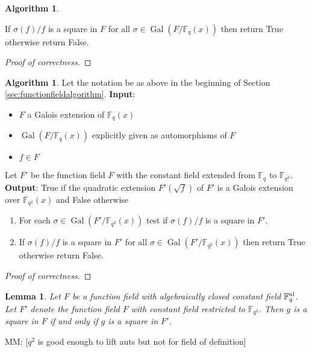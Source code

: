 \documentclass{dcthesis}
\newcommand{\mm}[1]{{\color{blue} \sf MM: [#1]}}
\newcommand{\FFqal}{{\mathbb F}_q^{\textup{al}}}
\newcommand{\FF}{\mathbb{F}}
\DeclareMathOperator{\Gal}{Gal}
\numberwithin{equation}{section}
\newtheorem{lemma}[equation]{Lemma}
\theoremstyle{definition}
\newtheorem{alg}[equation]{Algorithm}
\theoremstyle{remark}
\begin{document}
{{\begin{alg}
\begin{enumerate}
          If $\sigma(f)/f$ is a square in $F$
          for all $\sigma\in\Gal(F/\FF_q(x))$
          then return True
          otherwise return False.
      \end{enumerate}
    \end{alg}
    \begin{proof}[Proof of correctness]
    \end{proof}
    \begin{alg}
      \label{alg:isgaloisoverextension}
      Let the notation be
      as above in the beginning of
      Section
      \ref{sec:functionfieldalgorithm}.
      \newline
      \textbf{Input}:
      \begin{itemize}
        \item
          $F$ a Galois extension of
          $\FF_q(x)$
        \item
          $\Gal(F/\FF_q(x))$
          explicitly given
          as automorphisms of $F$
        \item
          $f\in F$
      \end{itemize}
      Let $F'$ be the function field $F$
      with the constant field
      extended
      from $\FF_q$ to $\FF_{q^2}$.
      \textbf{Output}:
      True if the quadratic extension
      $F'(\sqrt{f})$ of $F'$
      is a Galois extension over $\FF_{q^2}(x)$
      and False otherwise
      \begin{enumerate}
        \item
          For each $\sigma\in\Gal(F'/\FF_{q^2}(x))$
          test if $\sigma(f)/f$ is a square
          in $F'$.
        \item
          If $\sigma(f)/f$ is a square in $F'$
          for all $\sigma\in\Gal(F'/\FF_{q^2}(x))$
          then return True
          otherwise return False.
      \end{enumerate}
    \end{alg}
    \begin{proof}[Proof of correctness]
    \end{proof}
    \begin{lemma}
      \label{lem:qsquaredisgoodenough}
      Let $F$ be a function field
      with algebraically closed constant field
      $\FFqal$.
      Let $F'$ denote the function field $F$
      with constant field restricted to
      $\FF_{q^2}$.
      Then $g$ is a square in $F$ if and only if
      $g$ is a square in $F'$.
    \end{lemma}
    \mm{$q^2$ is good enough to lift auts but not for field of definition}
}}
\end{document}
